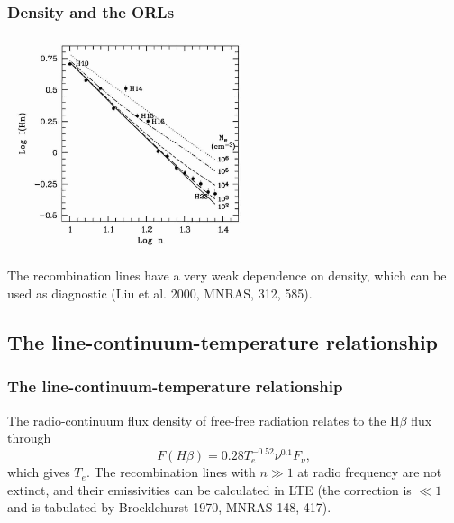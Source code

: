 \begin{frame}\frametitle{Density and the ORLs}

%
%

\begin{center}
\includegraphics[width=0.55\textwidth,height=!]{./C/Hn_Ne.jpg}
\end{center}   

The recombination lines have a very weak dependence on density, which
can be used as diagnostic (Liu et al. 2000, MNRAS, 312, 585).


\end{frame}
\subsection{The line-continuum-temperature relationship }
\begin{frame}\frametitle{The line-continuum-temperature relationship   }


The radio-continuum flux density of free-free radiation relates to the
H$\beta$ flux through
\[
F(H\beta) = 0.28 T_e^{-0.52} \nu^{0.1} F_\nu,
\]
which gives $T_e$. The recombination lines with $n\gg 1$ at radio
frequency are not extinct, and their emissivities can be calculated in
LTE (the correction is $\ll 1$ and is tabulated by Brocklehurst 1970,
MNRAS 148, 417).


\end{frame}

